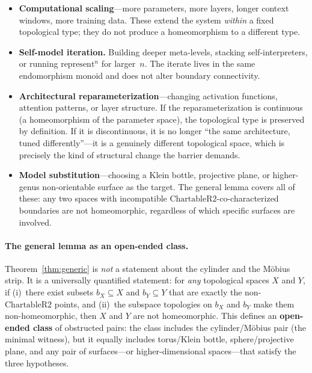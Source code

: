 \documentclass[11pt]{article}
\begin{document}
\begin{itemize}[leftmargin=1.5em,itemsep=0.2ex,topsep=0.4ex,parsep=0pt]
\item \textbf{Computational scaling}---more parameters, more layers,
  longer context windows, more training data.  These extend the system
  \emph{within} a fixed topological type; they do not produce a
  homeomorphism to a different type.
\item \textbf{Self-model iteration.}  Building deeper
  meta-levels, stacking self-interpreters, or running
  $\mathrm{represent}^n$ for larger~$n$.  The iterate lives in the
  same endomorphism monoid and does not alter boundary connectivity.
\item \textbf{Architectural reparameterization}---changing activation
  functions, attention patterns, or layer structure.  If the
  reparameterization is continuous (a homeomorphism of the parameter
  space), the topological type is preserved by definition.  If it is
  discontinuous, it is no longer ``the same architecture, tuned
  differently''---it is a genuinely different topological space, which
  is precisely the kind of structural change the barrier demands.
\item \textbf{Model substitution}---choosing a Klein bottle, projective
  plane, or higher-genus non-orientable surface as the target.  The
  general lemma covers all of these: any two spaces with incompatible
  $\mathrm{ChartableR2}$-co-characterized boundaries are not
  homeomorphic, regardless of which specific surfaces are involved.
\end{itemize}

\paragraph{The general lemma as an open-ended class.}
Theorem~\ref{thm:generic} is \emph{not} a statement about the cylinder
and the M\"obius strip.  It is a universally quantified statement: for
\emph{any} topological spaces $X$ and $Y$, if (i)~there exist subsets
$b_X \subseteq X$ and $b_Y \subseteq Y$ that are exactly the
non-$\mathrm{ChartableR2}$ points, and (ii)~the subspace topologies on
$b_X$ and $b_Y$ make them non-homeomorphic, then $X$ and $Y$ are not
homeomorphic.  This defines an \textbf{open-ended class} of obstructed
pairs: the class includes the cylinder/M\"obius pair (the minimal
witness), but it equally includes torus/Klein bottle,
sphere/projective plane, and any pair of surfaces---or higher-dimensional
spaces---that satisfy the three hypotheses.
\end{document}
